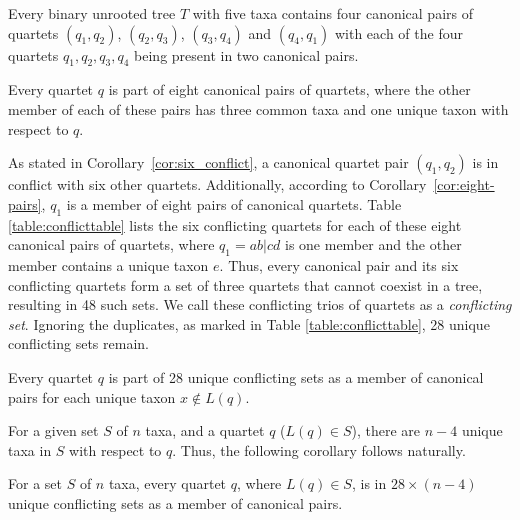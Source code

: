 \documentclass[runningheads]{llncs}
\begin{document}
\begin{appendices}
\begin{corollary}
\label{cor:two-pair-quartets}
 
Every binary unrooted tree $T$ with five taxa contains four canonical pairs of quartets $(q_1,q_2)$, $(q_2,q_3)$, $(q_3,q_4)$ and $(q_4,q_1)$ with each of the four quartets $q_1, q_2, q_3, q_4$ being present in two canonical pairs. 
\end{corollary}

\begin{corollary}
\label{cor:eight-pairs}
Every quartet $q$ is part of eight canonical pairs of quartets, where the other member of each of these pairs has three common taxa and one unique taxon with respect to $q$.\end{corollary}


As stated in Corollary~\ref{cor:six_conflict}, a canonical quartet pair $(q_1, q_2)$ is in conflict with six other quartets. Additionally, according to Corollary~\ref{cor:eight-pairs}, $q_1$ is a member of eight pairs of canonical quartets. Table \ref{table:conflicttable} lists the six conflicting quartets for each of these eight canonical pairs of quartets, where $q_1=ab|cd$ is one member and the other member contains a unique taxon $e$. Thus, every canonical pair and its six conflicting quartets form a set of three quartets that cannot coexist in a tree, resulting in 48 such sets. We call these conflicting trios of quartets as a \textit{conflicting set}. Ignoring the duplicates, as marked in Table \ref{table:conflicttable}, 28 unique conflicting sets remain.



\vspace{-3em}
\begin{corollary}
\label{cor:unique-conflict}
Every quartet $q$ is part of 28 unique conflicting sets as a member of canonical pairs for each unique taxon $x \notin L(q) $.
\end{corollary}

For a given set $S$ of $n$ taxa, and a quartet $q$ ($L(q) \in S$), there are $n-4$ unique taxa in $S$ with respect to $q$. Thus, the following corollary follows naturally.

\begin{corollary}
\label{cor:total_unique_conflict}
For a set $S$ of $n$ taxa, every quartet $q$, where $L(q) \in S$, is in $28 \times (n-4)$ unique conflicting sets as a member of canonical pairs.
\end{corollary}


\end{appendices}
\end{document}
